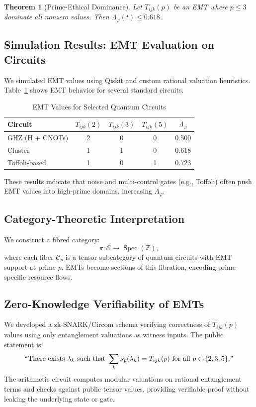 \documentclass[12]{amsart}
\theoremstyle{plain}
\newtheorem{theorem}{Theorem}[section]
\begin{document}
\begin{theorem}[Prime-Ethical Dominance]
Let $T_{ijk}(p)$ be an EMT where $p \leq 3$ dominate all nonzero values. Then $\Lambda_\varphi(t) \leq 0.618$.
\end{theorem}

\subsection{Simulation Results: EMT Evaluation on Circuits}

We simulated EMT values using Qiskit and custom rational valuation heuristics. Table~\ref{tab:emt-values} shows EMT behavior for several standard circuits.

\begin{table}[h]
\centering
\caption{EMT Values for Selected Quantum Circuits}
\label{tab:emt-values}
\begin{tabular}{l|ccc|c}
\textbf{Circuit} & $T_{ijk}(2)$ & $T_{ijk}(3)$ & $T_{ijk}(5)$ & $\Lambda_\varphi$ \\
\hline
GHZ (H + CNOTs)   & 2 & 0 & 0 & 0.500 \\
Cluster           & 1 & 1 & 0 & 0.618 \\
Toffoli-based     & 1 & 0 & 1 & 0.723 \\
\end{tabular}
\end{table}

These results indicate that noise and multi-control gates (e.g., Toffoli) often push EMT values into high-prime domains, increasing $\Lambda_\varphi$.

\subsection{Category-Theoretic Interpretation}

We construct a fibred category:
\[
\pi: \mathcal{C} \to \operatorname{Spec}(\mathbb{Z}),
\]
where each fiber $\mathcal{C}_p$ is a tensor subcategory of quantum circuits with EMT support at prime $p$. EMTs become sections of this fibration, encoding prime-specific resource flows.

\subsection{Zero-Knowledge Verifiability of EMTs}

We developed a zk-SNARK/Circom schema verifying correctness of $T_{ijk}(p)$ values using only entanglement valuations as witness inputs. The public statement is:
\[
\text{``There exists } \lambda_k \text{ such that } \sum_k \nu_p(\lambda_k) = T_{ijk}(p) \text{ for all } p \in \{2,3,5\}." 
\]
The arithmetic circuit computes modular valuations on rational entanglement terms and checks against public tensor values, providing verifiable proof without leaking the underlying state or gate.
\end{document}
